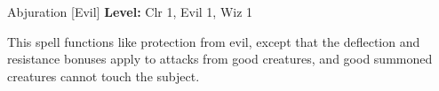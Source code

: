 {Abjuration [Evil]}
{
	\textbf{Level:}
	Clr 1, Evil 1, Wiz 1\\
}
{
	This spell functions like protection from evil, except that the deflection and resistance bonuses apply to attacks from good creatures, and good summoned creatures cannot touch the subject.

}
